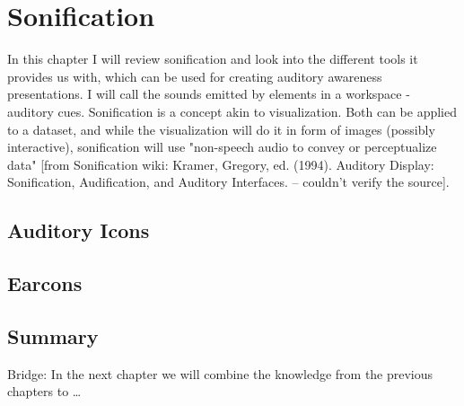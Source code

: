 \chapter{Sonification}

In this chapter I will review sonification and look into the different tools it provides us with, which can be used for creating auditory awareness presentations. I will call the sounds emitted by elements in a workspace - auditory cues. Sonification is a concept akin to visualization. Both can be applied to a dataset, and while the visualization will do it in form of images (possibly interactive), sonification will use "non-speech audio to convey or perceptualize data" [from Sonification wiki: Kramer, Gregory, ed. (1994). Auditory Display: Sonification, Audification, and Auditory Interfaces. -- couldn't verify the source].
	
\section{Auditory Icons}
\section{Earcons}
\section{Summary}

Bridge: In the next chapter we will combine the knowledge from the previous chapters to …